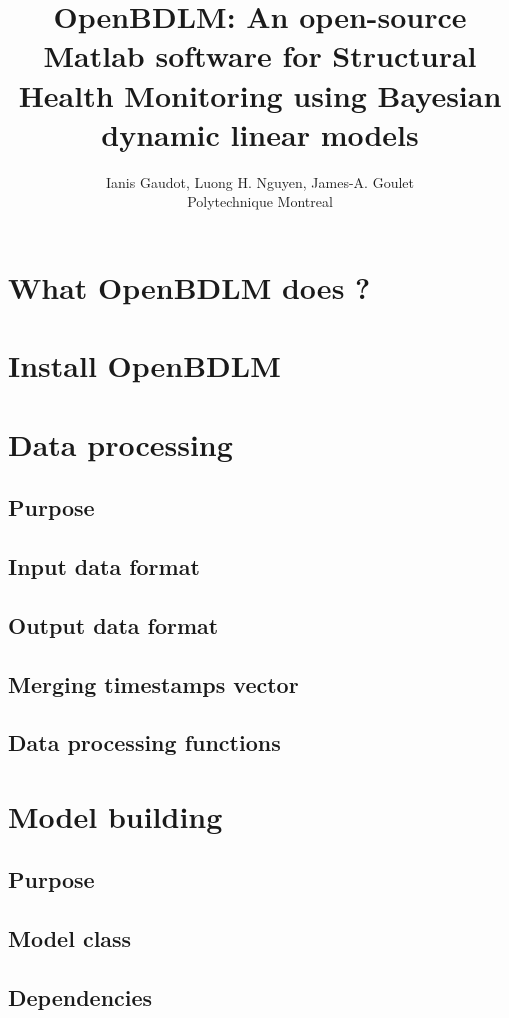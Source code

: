 \documentclass{book}
\title{OpenBDLM: An open-source Matlab software for Structural Health Monitoring using Bayesian dynamic linear models}
\author{Ianis Gaudot, Luong H. Nguyen, James-A. Goulet \\ Polytechnique Montreal}
\begin{document}
\maketitle

\tableofcontents

\chapter{What OpenBDLM does ?}
\newpage

\chapter{Install OpenBDLM}
\newpage

\chapter{Data processing}
\section{Purpose}
\section{Input data format}
\section{Output data format}
\section{Merging timestamps vector}
\section{Data processing functions}
\newpage

\chapter{Model building}
\section{Purpose}
\section{Model class}
\section{Dependencies}
\end{document}
